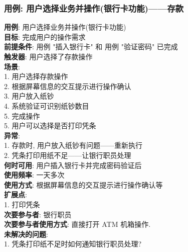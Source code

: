 \documentclass[UTF8]{article}
\begin{document}
\subsubsection{用例: 用户选择业务并操作(银行卡功能)——存款}
\noindent
\textbf{用例}: 用户选择业务并操作(银行卡功能)
\\
\textbf{目标}: 完成用户的操作需求
\\
\textbf{前提条件}: 用例 "插入银行卡" 和 用例 "验证密码" 已完成
\\
\textbf{触发器}: 用户选择了存款操作
\\
\textbf{场景}: \\
	\hspace*{2em}1. 用户选择存款操作 \\
	\hspace*{2em}2. 根据屏幕信息的交互提示进行操作确认 \\
	\hspace*{2em}3. 用户放入纸钞 \\
	\hspace*{2em}4. 系统验证可识别纸钞数目 \\
	\hspace*{2em}5. 完成操作 \\
	\hspace*{2em} 5. 用户可以选择是否打印凭条 \\
\textbf{异常}: \\
	\hspace*{2em} 1. 存款时, 用户放入纸钞有问题——重新执行 \\
	\hspace*{2em} 2. 凭条打印用纸不足——让银行职员处理 \\
\textbf{何时可用}: 用户插入银行卡并完成密码验证后
\\
\textbf{使用频率}: 一天多次
\\
\textbf{使用方式}: 根据屏幕信息的交互提示进行操作确认等
\\
\textbf{扩展点}: \\
	\hspace*{2em}1. 打印凭条 \\
\textbf{次要参与者}: 银行职员
\\
\textbf{次要参与者使用方式}: 直接打开 ATM 机箱操作.
\\
\textbf{未解决的问题}: \\
	\hspace*{2em} 1. 凭条打印纸不足时如何通知银行职员处理? \\
	
\end{document}
